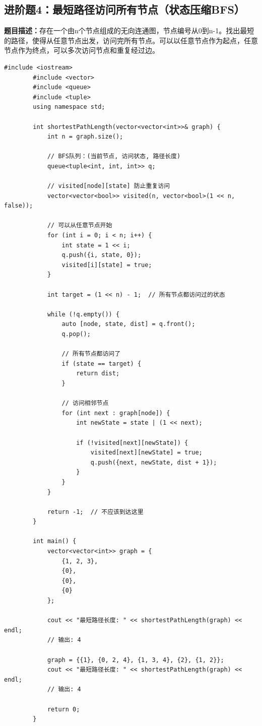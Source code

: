 \documentclass[12pt,a4paper]{article}
\begin{document}
	\subsection{进阶题4：最短路径访问所有节点（状态压缩BFS）}
	
	\textbf{题目描述：}存在一个由n个节点组成的无向连通图，节点编号从0到n-1。找出最短的路径，使得从任意节点出发，访问完所有节点。可以以任意节点作为起点，任意节点作为终点，可以多次访问节点和重复经过边。
	
	\begin{lstlisting}[caption={进阶题4：最短路径访问所有节点 - BFS+状态压缩}]
		#include <iostream>
		#include <vector>
		#include <queue>
		#include <tuple>
		using namespace std;
		
		int shortestPathLength(vector<vector<int>>& graph) {
			int n = graph.size();
			
			// BFS队列：(当前节点, 访问状态, 路径长度)
			queue<tuple<int, int, int>> q;
			
			// visited[node][state] 防止重复访问
			vector<vector<bool>> visited(n, vector<bool>(1 << n, false));
			
			// 可以从任意节点开始
			for (int i = 0; i < n; i++) {
				int state = 1 << i;
				q.push({i, state, 0});
				visited[i][state] = true;
			}
			
			int target = (1 << n) - 1;  // 所有节点都访问过的状态
			
			while (!q.empty()) {
				auto [node, state, dist] = q.front();
				q.pop();
				
				// 所有节点都访问了
				if (state == target) {
					return dist;
				}
				
				// 访问相邻节点
				for (int next : graph[node]) {
					int newState = state | (1 << next);
					
					if (!visited[next][newState]) {
						visited[next][newState] = true;
						q.push({next, newState, dist + 1});
					}
				}
			}
			
			return -1;  // 不应该到达这里
		}
		
		int main() {
			vector<vector<int>> graph = {
				{1, 2, 3},
				{0},
				{0},
				{0}
			};
			
			cout << "最短路径长度: " << shortestPathLength(graph) << endl;
			// 输出: 4
			
			graph = {{1}, {0, 2, 4}, {1, 3, 4}, {2}, {1, 2}};
			cout << "最短路径长度: " << shortestPathLength(graph) << endl;
			// 输出: 4
			
			return 0;
		}
	\end{lstlisting}
	
\end{document}

